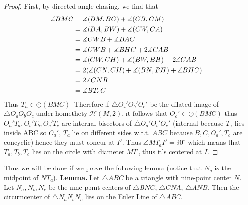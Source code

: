 \begin{proof}
    First, by directed angle chasing, we find that
    \begin{align*}
        \measuredangle BMC &= \measuredangle(BM, BC) + \measuredangle(CB, CM) \\
        &= \measuredangle(BA, BW) + \measuredangle(CW, CA) \\
        &= \measuredangle CWB + \measuredangle BAC \\
        &= \measuredangle CWB + \measuredangle BHC + 2\measuredangle CAB \\
        &= \measuredangle(CW, CH)+\measuredangle(BW, BH) + 2\measuredangle CAB \\
        &= 2(\measuredangle(CN, CH) + \measuredangle(BN, BH) + \measuredangle BHC) \\
        &= 2\measuredangle CNB \\
        &= \measuredangle BT_aC
    \end{align*}
    Thus $T_a\in\odot(BMC)$. Therefore if $\triangle O_a'O_b'O_c'$ be the dilated image of $\triangle O_aO_bO_c$ under homothety $\mathcal{H}(M,2)$, it follows that $O_a'\in\odot(BMC)$ thus $O_a'T_a, O_b'T_b, O_c'T_c$ are internal bisectors of $\triangle O_a'O_b'O_c'$ (internal because $T_a$ lies inside ABC so $O_a'$, $T_a$ lie on different sides w.r.t. $ABC$ because $B, C, O_a', T_a$ are concyclic) hence they must concur at $I'$. Thus $\angle MT_aI'=90^{\circ}$ which means that $T_a, T_b, T_c$ lies on the circle with diameter $MI'$, thus it's centered at $I$.
\end{proof}
\noindent Thus we will be done if we prove the following lemma (notice that $N_a$ is the midpoint of $NT_a$).\nl
\textbf{Lemma.}
Let $\triangle ABC$ be a triangle with nine-point center $N$. Let $N_a, N_b, N_c$ be the nine-point centers of $\triangle BNC$, $\triangle CNA$, $\triangle ANB$. Then the circumcenter of $\triangle N_aN_bN_c$ lies on the Euler Line of $\triangle ABC$.
